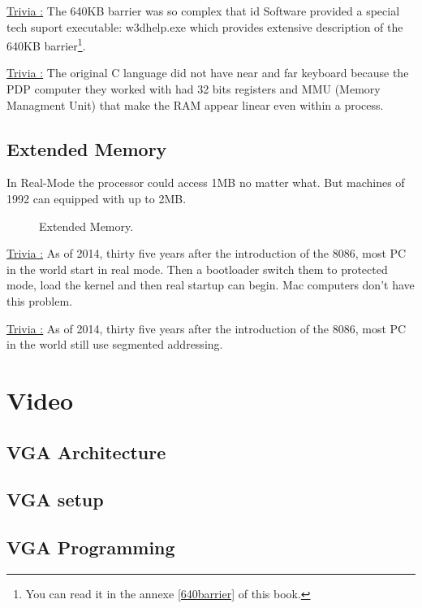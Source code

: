\documentclass[book.tex]{subfiles}
\begin{document}
\bigskip

{\underline{Trivia :}} The 640KB barrier was so complex that id Software provided a special tech suport executable: w3dhelp.exe which provides extensive description of the 640KB barrier\footnote{You can read it in the annexe \ref{640barrier} of this book.}.

\bigskip

{\underline{Trivia :}} The original C language did not have near and far keyboard because the PDP computer they worked with had 32 bits registers and MMU (Memory Managment Unit) that make the RAM appear linear even within a process.




  \subsection{Extended Memory}

In Real-Mode the processor could access 1MB no matter what. But machines of 1992 can equipped with up to 2MB. 

  \begin{figure}[H]
\centering
 
 \caption{Extended Memory.}
 \end{figure}


{\underline{Trivia :}}  As of 2014, thirty five years after the introduction of the 8086, most PC in the world start in  real mode. Then a bootloader switch them to protected mode, load the kernel and then real startup can begin. Mac computers don’t have this problem.

\bigskip

{\underline{Trivia :}}  As of 2014, thirty five years after the introduction of the 8086, most PC in the world still use segmented addressing.




\section{Video}
  \subsection{VGA Architecture}
  \subsection{VGA setup}
  \subsection{VGA Programming}
\end{document}
